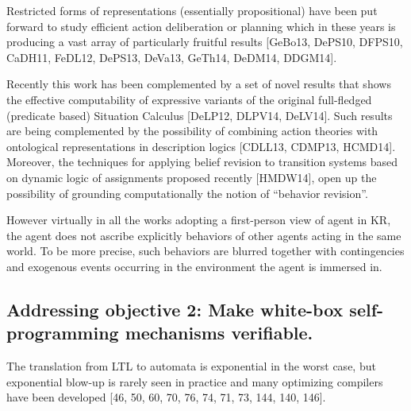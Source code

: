 Restricted forms of representations
(essentially propositional) have been put forward to study efficient
action deliberation or planning which in these years is producing a
vast array of particularly fruitful results [GeBo13, DePS10, DFPS10,
CaDH11, FeDL12, DePS13, DeVa13, GeTh14, DeDM14, DDGM14].

Recently this work has been complemented by a set of novel results
that shows the effective computability of expressive variants of the
original full-fledged (predicate based) Situation Calculus [DeLP12,
DLPV14, DeLV14]. Such results are being complemented by the
possibility of combining action theories with ontological
representations in description logics [CDLL13, CDMP13,
HCMD14]. Moreover, the techniques for applying belief revision to
transition systems based on dynamic logic of assignments proposed
recently [HMDW14], open up the possibility of grounding
computationally the notion of “behavior revision”.

However virtually in all the works adopting a first-person view of
agent in KR, the agent does not ascribe explicitly behaviors of other
agents acting in the same world. To be more precise, such behaviors
are blurred together with contingencies and exogenous events occurring
in the environment the agent is immersed in.


\subsection{Addressing objective 2: Make white-box self-programming mechanisms verifiable.}

The translation from LTL to automata is exponential in the worst case, but exponential blow-up is rarely seen in practice and many optimizing compilers have been developed [46, 50, 60, 70, 76, 74, 71, 73, 144, 140, 146].








